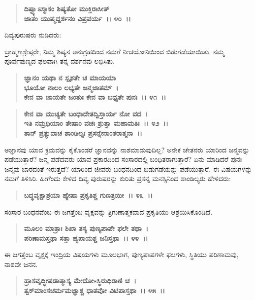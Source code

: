 \begin{verse}
\textbf{ದಿಷ್ಟ್ಯಾಽಸ್ಮಾಕಂ ಶಿಷ್ಯತೋ ಮುಕ್ತಿರಾಸೀತ್}\\\textbf{ಜಾತಂ ಯುಷ್ಮದ್ದರ್ಶನಂ ವಿಪ್ರವರ್ಯ~।। ೪೦~।।}
\end{verse}

\begin{flushleft}
ದಿವ್ಯಪುರುಷರು ನುಡಿದರು:
\end{flushleft}

ಬ್ರಾಹ್ಮಣಶ್ರೇಷ್ಠರೇ, ನಿಮ್ಮ ಶಿಷ್ಯನ ಅನುಗ್ರಹದಿಂದ ನಮಗೆ ನೀಚಯೋನಿಯಿಂದ ಬಿಡುಗಡೆಯಾಯಿತು. ನಮ್ಮ ಪೂರ್ವಪುಣ್ಯದ ಫಲವಾಗಿ ತನ್ನ ದರ್ಶನವು ಲಭಿಸಿತು.

\begin{verse}
\textbf{ಜ್ಞಾನಂ ಯಥಾ ನ ಸ್ಪೃಶತೇ ಚ ಮಾಯಯಾ}\\\textbf{ಭೂಯೋ ನಾಲಂ ಲಭ್ಯತೇ ಜನ್ಮಜಾತಮ್~। }\\\textbf{ಕೇನ ವಾ ಜಾಯತೇ ಜಂತುಃ ಕೇನ ವಾ ಬಧ್ಯತೇ ಪುನಃ~।। ೪೧~।। }
\end{verse}

\begin{verse}
\textbf{ಕೇನ ವಾ ಮುಚ್ಯತೇ ಬಂಧಾದೇತದ್ವಿಸ್ತಾರ್ಯ ನೋ ವದ~।}\\\textbf{ಇತಿ ನಮ್ರಧಿಯಾಂ ತೇಷಾಂ ವಚಃ ಶ್ರುತ್ವಾ ಮಹಾಮತಿಃ~।। ೪೨~।।}\\\textbf{ತಾನ್ ಪ್ರತ್ಯುವಾಚ ಶಾಂಡಿಲ್ಯಃ ಪ್ರಸನ್ನೇನಾಂತರಾತ್ಮನಾ~।।}
\end{verse}

ಅಜ್ಞಾನವು ಯಾವ ಕ್ರಮವನ್ನು ಕೈಕೊಂಡರೆ ಜ್ಞಾನವನ್ನು ನಾಶಮಾಡುವುದಿಲ್ಲ? ಅನೇಕ ಚೇತನರು ಯಾರಿಂದ ಜನ್ಮವನ್ನು ಪಡೆಯುತ್ತಾರೆ? ಜನ್ಮ ಪಡೆದವರು ಯಾವ ಪ್ರಕಾರದಿಂದ ಸಂಸಾರದಲ್ಲಿ ಬಂಧಿತರಾಗುತ್ತಾರೆ? ಏನು ಮಾಡಿದರೆ ಪುನಃ ಜನ್ಮವು ಬಾರದಂತೆ ಇರುತ್ತದೆ? ಯಾರಿಂದ ಜೀವರು ಬಂಧನದಿಂದ ಬಿಡುಗಡೆಯನ್ನು ಪಡೆಯುತ್ತಾರೆ. ಈ ವಿಷಯಗಳನ್ನು ನಮಗೆ ತಿಳಿಸಿರಿ. ಹೀಗೆಂದು ಕೇಳಿದ ದಿವ್ಯ ಪುರುಷರನ್ನು ಕುರಿತು ಪ್ರಸನ್ನ ಮನಸ್ಸಿನಿಂದ ಶಾಂಡಿಲ್ಯರು ಹೇಳಿದರು:

\begin{verse}
\textbf{ಬದ್ಧವೃಕ್ಷಾಶ್ರಯಾ ಹ್ಯೇಷಾ ಪ್ರಕೃತಿಶ್ಚ ಗುಣತ್ರಯೀ~।। ೪೩~।।}
\end{verse}

ಸಂಸಾರ ಬಂಧನವೆಂಬ ಈ ಜಗತ್ತೆಂಬ ವೃಕ್ಷವನ್ನು ತ್ರಿಗುಣಾತ್ಮಕವಾದ ಪ್ರಕೃತಿಯು ಆಶ್ರಯಿಸಿಕೊಂಡಿದೆ.

\begin{verse}
\textbf{ಮೂಲಂ ಮಾತ್ರಾಃ ಶಿಖಾ ತಸ್ಯ ಪುಣ್ಯಪಾಪೇ ಫಲೇ ತಥಾ~।}\\\textbf{ಪರಿಣಾಮಸ್ತಥಾ ಸತ್ತಾ ಹ್ಯಪಾಯಶ್ಚ ಜನಿಸ್ತಥಾ~।। ೪೪~।।}
\end{verse}

ಈ ಜಗತ್ತೆಂಬ ವೃಕ್ಷಕ್ಕೆ ಇಂದ್ರಿಯ ವಿಷಯಗಳು ಮೂಲಭಾಗ, ಪುಣ್ಯಪಾಪಗಳೇ ಫಲಗಳು, ಸ್ಥಿತಿಯು ಪರಿಣಾಮವು, ನಾಶವೇ ಜನನ.

\begin{verse}
\textbf{ಹ್ರಾಸವೃದ್ಧೀಷಡಾತ್ಮಾಸ್ಯ ಮೇದೋsಸ್ಥಿರುಧಿರಾಣಿ ಚ~।}\\\textbf{ತ್ವಕ್‌ಮಾಂಸಚರ್ಮಮಜ್ಞಾಶ್ಚ ಧಾತವೋ ವಿಟಿಪಾಸ್ತಥಾ~।। ೪೫~।।}
\end{verse}

